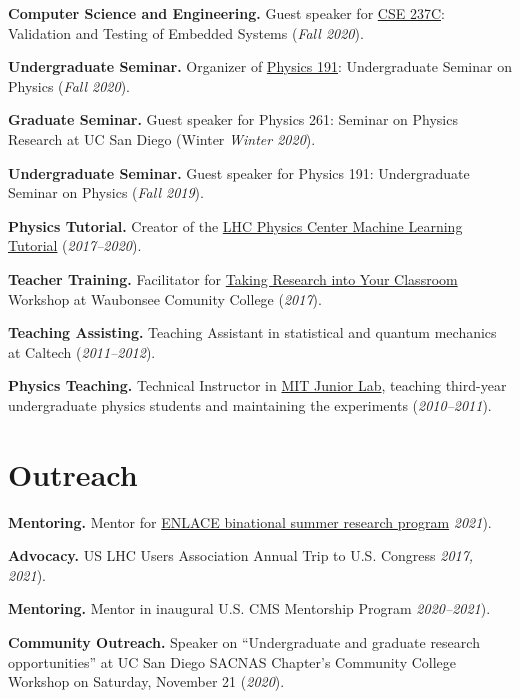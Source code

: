 \documentclass[11pt]{res}
\newcommand{\MarginText}[1]{\section{#1}\vspace{10pt}}
\begin{document}
\begin{resume}
\textbf{Computer Science and Engineering.} Guest speaker for \href{http://kastner.ucsd.edu/ryan/cse237c/}{CSE 237C}: Validation and Testing of Embedded Systems (\textit{Fall 2020}).

\textbf{Undergraduate Seminar.} Organizer of \href{https://indico.cern.ch/event/956641/}{Physics 191}: Undergraduate Seminar on Physics (\textit{Fall 2020}).

\textbf{Graduate Seminar.} Guest speaker for Physics 261: Seminar on Physics Research at UC San Diego (Winter \textit{Winter 2020}).

\textbf{Undergraduate Seminar.} Guest speaker for Physics 191: Undergraduate Seminar on Physics (\textit{Fall 2019}).

\textbf{Physics Tutorial.} Creator of the \href{https://github.com/FNALLPC/machine-learning-hats}{LHC Physics Center Machine Learning Tutorial} (\textit{2017--2020}).

\textbf{Teacher Training.} Facilitator for \href{http://eddata.fnal.gov/lasso/program_search/show_workshopID_new.lasso?event_id=435}{Taking Research into Your Classroom} Workshop at Waubonsee Comunity College (\textit{2017}).

\textbf{Teaching Assisting.} Teaching Assistant in statistical and quantum mechanics at Caltech (\textit{2011--2012}).

\textbf{Physics Teaching.} Technical Instructor in \href{http://web.mit.edu/8.13/www/index.shtml}{MIT Junior Lab}, teaching third-year undergraduate physics students and maintaining the experiments (\textit{2010--2011}).


\MarginText{Outreach}

\textbf{Mentoring.} Mentor for \href{http://resilientmaterials.ucsd.edu/ENLACE}{ENLACE binational summer research program} \textit{2021}).

\textbf{Advocacy.} US LHC Users Association Annual Trip to U.S. Congress \textit{2017, 2021}).

\textbf{Mentoring.} Mentor in inaugural U.S. CMS Mentorship Program \textit{2020--2021}).

\textbf{Community Outreach.} Speaker on ``Undergraduate and graduate research opportunities'' at UC San Diego SACNAS Chapter's Community College Workshop on Saturday, November 21 (\textit{2020}).


\end{resume}
\end{document}
